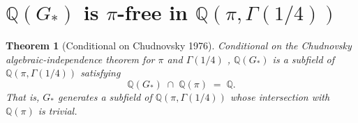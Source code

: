 \documentclass[11pt,reqno]{amsart}
\theoremstyle{plain}
\newtheorem{theorem}{Theorem}[section]
\theoremstyle{definition}
\theoremstyle{remark}
\numberwithin{equation}{section}
\newcommand{\Gstar}{G_{\!*}}
\begin{document}
\section{$\mathbb{Q}(\Gstar)$ is $\pi$-free in $\mathbb{Q}(\pi, \Gamma(1/4))$}
\label{sec:qg}

\begin{theorem}[Conditional on Chudnovsky 1976]
\label{thm:qgstar}
\emph{Conditional on the Chudnovsky algebraic-independence theorem
for $\pi$ and $\Gamma(1/4)$ \cite{chudnovsky1976},}
$\mathbb{Q}(\Gstar)$ is a subfield of $\mathbb{Q}(\pi, \Gamma(1/4))$
satisfying
\begin{equation}
\label{eq:qg-trivial-int}
  \mathbb{Q}(\Gstar) \;\cap\; \mathbb{Q}(\pi) \;=\; \mathbb{Q}.
\end{equation}
That is, $\Gstar$ generates a subfield of
$\mathbb{Q}(\pi, \Gamma(1/4))$ whose intersection with
$\mathbb{Q}(\pi)$ is trivial.
\end{theorem}
\end{document}
